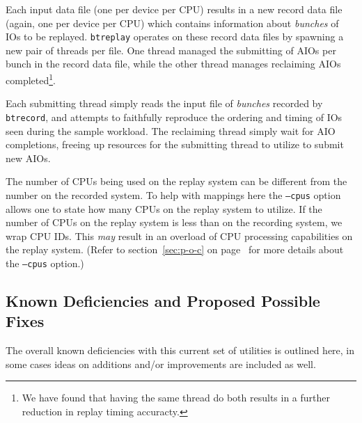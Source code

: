 \documentclass{article}
\begin{document}
Each input data file (one per device per CPU) results in a new record
data file (again, one per device per CPU) which contains information
about \emph{bunches} of IOs to be replayed. \texttt{btreplay} operates on
these record data files by spawning a new pair of threads per file. One
thread managed the submitting of AIOs per bunch in the record data file,
while the other thread manages reclaiming AIOs completed\footnote{We
have found that having the same thread do both results in a further
reduction in replay timing accuracty.}.

Each submitting thread simply reads the input file of \emph{bunches}
recorded by \texttt{btrecord}, and attempts to faithfully reproduce the
ordering and timing of IOs seen during the sample workload. The reclaiming
thread simply wait for AIO completions, freeing up resources for the
submitting thread to utilize to submit new AIOs.

The number of CPUs being used on the replay system can be different from
the number on the recorded system. To help with mappings here the
\texttt{--cpus} option allows one to state how many CPUs on the replay
system to utilize. If the number of CPUs on the replay system is less than
on the recording system, we wrap CPU IDs. This \emph{may} result in an
overload of CPU processing capabilities on the replay system. (Refer to
section~\ref{sec:p-o-c} on page~\pageref{sec:p-o-c} for more details about the
\texttt{--cpus} option.)

\newpage\subsection{Known Deficiencies and Proposed Possible Fixes}

The overall known deficiencies with this current set of utilities is
outlined here, in some cases ideas on additions and/or improvements are
included as well.
\end{document}
